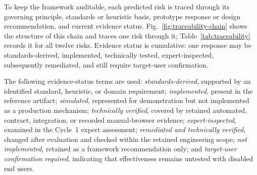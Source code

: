 \documentclass[journal]{IEEEtran}
\begin{document}
To keep the framework auditable, each predicted risk is traced through its governing principle, standards or heuristic basis, prototype response or design recommendation, and current evidence status. Fig.~\ref{fig:traceability-chain} shows the structure of this chain and traces one risk through it; Table~\ref{tab:traceability} records it for all twelve risks. Evidence status is cumulative: one response may be standards-derived, implemented, technically tested, expert-inspected, subsequently remediated, and still require target-user confirmation.

The following evidence-status terms are used: \textit{standards-derived}, supported by an identified standard, heuristic, or domain requirement; \textit{implemented}, present in the reference artifact; \textit{simulated}, represented for demonstration but not implemented as a production mechanism; \textit{technically verified}, covered by retained automated, contract, integration, or recorded manual-browser evidence; \textit{expert-inspected}, examined in the Cycle~1 expert assessment; \textit{remediated and technically verified}, changed after evaluation and checked within the retained engineering scope; \textit{not implemented}, retained as a framework recommendation only; and \textit{target-user confirmation required}, indicating that effectiveness remains untested with disabled end users.
\end{document}
